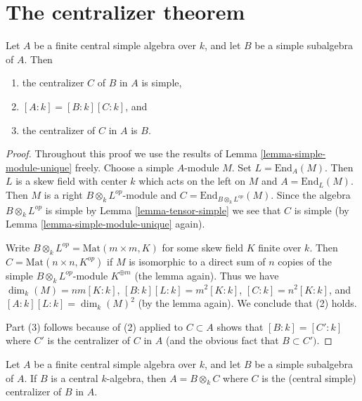 \section{The centralizer theorem}
\label{section-centralizer}


\begin{theorem}
\label{theorem-centralizer}
Let $A$ be a finite central simple algebra over $k$, and let
$B$ be a simple subalgebra of $A$. Then
\begin{enumerate}
\item the centralizer $C$ of $B$ in $A$ is simple,
\item $[A : k] = [B : k][C : k]$, and
\item the centralizer of $C$ in $A$ is $B$.
\end{enumerate}
\end{theorem}

\begin{proof}
Throughout this proof we use the results of
Lemma \ref{lemma-simple-module-unique} freely.
Choose a simple $A$-module $M$. Set $L = \text{End}_A(M)$.
Then $L$ is a skew field with center $k$ which acts on the left on $M$
and $A = \text{End}_L(M)$.
Then $M$ is a right $B \otimes_k L^{op}$-module and
$C = \text{End}_{B \otimes_k L^{op}}(M)$.
Since the algebra $B \otimes_k L^{op}$ is simple by
Lemma \ref{lemma-tensor-simple} we see that $C$ is simple (by
Lemma \ref{lemma-simple-module-unique} again).

\medskip\noindent
Write $B \otimes_k L^{op} = \text{Mat}(m \times m, K)$ for some
skew field $K$ finite over $k$. Then $C = \text{Mat}(n \times n, K^{op})$
if $M$ is isomorphic to a direct sum of $n$ copies of the simple
$B \otimes_k L^{op}$-module $K^{\oplus m}$ (the lemma again). Thus we have
$\dim_k(M) = nm [K : k]$, $[B : k] [L : k] = m^2 [K : k]$,
$[C : k] = n^2 [K : k]$, and $[A : k] [L : k] = \dim_k(M)^2$ (by
the lemma again). We conclude that (2) holds.

\medskip\noindent
Part (3) follows because of (2) applied to $C \subset A$ shows
that $[B : k] = [C' : k]$ where $C'$ is the centralizer of $C$ in $A$
(and the obvious fact that $B \subset C')$.
\end{proof}

\begin{lemma}
\label{lemma-when-tensor-is-equal}
Let $A$ be a finite central simple algebra over $k$, and let
$B$ be a simple subalgebra of $A$. If $B$ is a central
$k$-algebra, then $A = B \otimes_k C$ where $C$ is the (central simple)
centralizer of $B$ in $A$.
\end{lemma}

